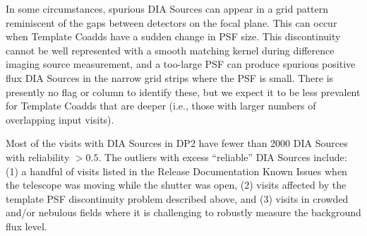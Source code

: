 In some circumstances, spurious \gls{DIA} Sources can appear in a grid pattern reminiscent of the gaps between detectors on the focal plane.
This can occur when \gls{Template} Coadds have a sudden change in PSF size.
This discontinuity cannot be well represented with a smooth matching kernel during difference imaging source measurement, and a too-large \gls{PSF} can produce spurious positive flux \gls{DIA} Sources in the narrow grid strips where the \gls{PSF} is small.
There is presently no flag or column to identify these, but we expect it to be less prevalent for \gls{Template} Coadds that are deeper (i.e., those with larger numbers of overlapping input visits).

Most of the visits with \gls{DIA} Sources in \gls{DP2} have fewer than 2000 \gls{DIA} Sources with reliability $>0.5$.
The outliers with excess ``reliable'' \gls{DIA} Sources include: (1) a handful of visits listed in the Release Documentation Known Issues when the telescope was moving while the shutter was open, (2) visits affected by the template \gls{PSF} discontinuity problem described above, and (3) visits in crowded and/or nebulous fields where it is challenging to robustly measure the background flux level.

